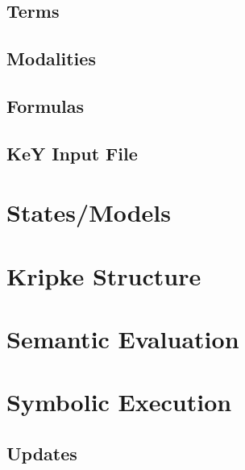 \documentclass[a4paper, 11pt, accentcolor = tud3b]{tudreport}
\begin{document}
            \subsection{Terms} %

            \subsection{Modalities} %

            \subsection{Formulas} %

            \subsection{KeY Input File} %

        \section{States/Models} %

        \section{Kripke Structure} %

        \section{Semantic Evaluation} %

        \section{Symbolic Execution} %

            \subsection{Updates} %
\end{document}
